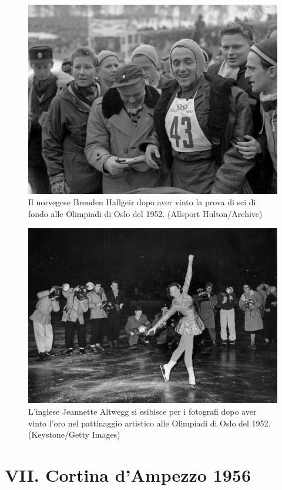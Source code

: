 \documentclass[
]{book}
\begin{document}
\begin{figure}
\includegraphics[width=0.8\linewidth]{images/IlPost/1952} \caption{Il norvegese Brenden Hallgeir dopo aver vinto la prova di sci di fondo alle Olimpiadi di Oslo del 1952. (Allsport Hulton/Archive)}\label{fig:unnamed-chunk-16}
\end{figure}

\begin{figure}
\includegraphics[width=0.8\linewidth]{images/IlPost/1952(2)} \caption{L'inglese Jeannette Altwegg si esibisce per i fotografi dopo aver vinto l'oro nel pattinaggio artistico alle Olimpiadi di Oslo del 1952. (Keystone/Getty Images)}\label{fig:unnamed-chunk-17}
\end{figure}

\chapter*{VII. Cortina d'Ampezzo 1956}\label{vii.-cortina-dampezzo-1956}
\end{document}
